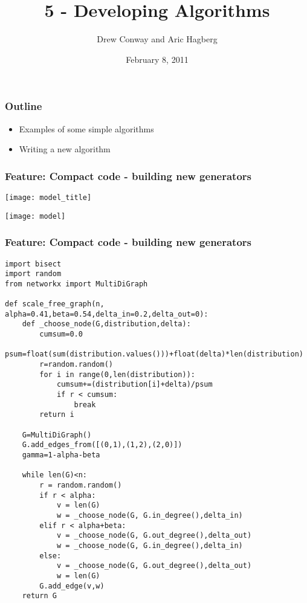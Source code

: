\documentclass[xcolor=dvipsnames, 9pt]{beamer}
\title{5 - Developing Algorithms}
\author{Drew Conway and Aric Hagberg}
\date{February 8, 2011}
\begin{document}
\begin{frame}[plain]
\titlepage
\end{frame}

\begin{frame}
\frametitle{Outline}
\begin{itemize}
\item Examples of some simple algorithms
\item Writing a new algorithm
\end{itemize}
\end{frame}

\begin{frame}[fragile]
\frametitle{Feature: Compact code - building new generators}
\centerline{\texttt{[image: model\_title]}}
\centerline{\texttt{[image: model]}}
\end{frame}


\begin{frame}[fragile]
\frametitle{Feature: Compact code - building new generators}
\begin{block}{}
\tiny
\begin{lstlisting}
import bisect
import random
from networkx import MultiDiGraph

def scale_free_graph(n, alpha=0.41,beta=0.54,delta_in=0.2,delta_out=0):
    def _choose_node(G,distribution,delta):
        cumsum=0.0
        psum=float(sum(distribution.values()))+float(delta)*len(distribution)
        r=random.random()
        for i in range(0,len(distribution)):
            cumsum+=(distribution[i]+delta)/psum
            if r < cumsum:  
                break
        return i

    G=MultiDiGraph()
    G.add_edges_from([(0,1),(1,2),(2,0)])
    gamma=1-alpha-beta

    while len(G)<n:
        r = random.random()
        if r < alpha:
            v = len(G) 
            w = _choose_node(G, G.in_degree(),delta_in)
        elif r < alpha+beta:
            v = _choose_node(G, G.out_degree(),delta_out)
            w = _choose_node(G, G.in_degree(),delta_in)
        else:
            v = _choose_node(G, G.out_degree(),delta_out)
            w = len(G) 
        G.add_edge(v,w)
    return G

\end{lstlisting}
\end{block}
\end{frame}
\end{document}
